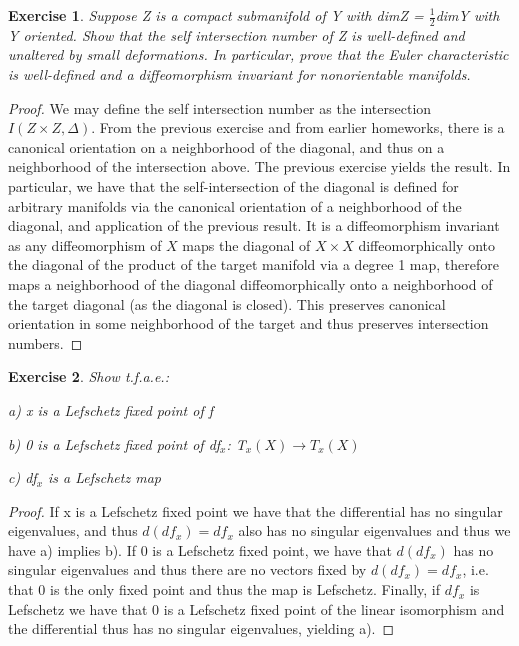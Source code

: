 \documentclass{article}
\newtheorem{exercise}{Exercise}
\begin{document}
\pagebreak

\begin{exercise}
  Suppose Z is a compact submanifold of Y with dimZ = $\frac{1}{2}$dimY with Y oriented. Show that the self intersection number of Z is well-defined and unaltered by small deformations. In particular, prove that the Euler characteristic is well-defined and a diffeomorphism invariant for nonorientable manifolds.
\end{exercise}

\begin{proof}
  We may define the self intersection number as the intersection $I(Z \times Z, \Delta)$. From the previous exercise and from earlier homeworks, there is a canonical orientation on a neighborhood of the diagonal, and thus on a neighborhood of the intersection above. The previous exercise yields the result. In particular, we have that the self-intersection of the diagonal is defined for arbitrary manifolds via the canonical orientation of a neighborhood of the diagonal, and application of the previous result. It is a diffeomorphism invariant as any diffeomorphism of $X$ maps the diagonal of $X \times X$ diffeomorphically onto the diagonal of the product of the target manifold via a degree 1 map, therefore maps a neighborhood of the diagonal diffeomorphically onto a neighborhood of the target diagonal (as the diagonal is closed). This preserves canonical orientation in some neighborhood of the target and thus preserves intersection numbers. 
\end{proof}

\begin{exercise}
  Show t.f.a.e.:

  a) x is a Lefschetz fixed point of f

  b) 0 is a Lefschetz fixed point of df$_{x}$: T$_{x}(X) \to T_{x}(X)$

  c) df$_{x}$ is a Lefschetz map
\end{exercise}

\begin{proof}
If x is a Lefschetz fixed point we have that the differential has no singular eigenvalues, and thus $d(df_{x}) = df_{x}$ also has no singular eigenvalues and thus we have a) implies b). If 0 is a Lefschetz fixed point, we have that $d(df_{x})$ has no singular eigenvalues and thus there are no vectors fixed by $d(df_{x}) = df_{x}$, i.e. that 0 is the only fixed point and thus the map is Lefschetz. Finally, if $df_{x}$ is Lefschetz we have that 0 is a Lefschetz fixed point of the linear isomorphism and the differential thus has no singular eigenvalues, yielding a).  
\end{proof}
\end{document}

